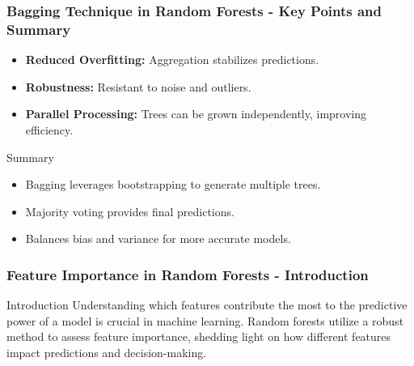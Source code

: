 \documentclass[aspectratio=169]{beamer}
\begin{document}
\begin{frame}[fragile]
    \frametitle{Bagging Technique in Random Forests - Key Points and Summary}
    \begin{itemize}
        \item \textbf{Reduced Overfitting:} Aggregation stabilizes predictions.
        \item \textbf{Robustness:} Resistant to noise and outliers.
        \item \textbf{Parallel Processing:} Trees can be grown independently, improving efficiency.
    \end{itemize}

    \begin{block}{Summary}
        \begin{itemize}
            \item Bagging leverages bootstrapping to generate multiple trees.
            \item Majority voting provides final predictions.
            \item Balances bias and variance for more accurate models.
        \end{itemize}
    \end{block}
\end{frame}

\begin{frame}[fragile]
    \frametitle{Feature Importance in Random Forests - Introduction}
    \begin{block}{Introduction}
        Understanding which features contribute the most to the predictive power of a model is crucial in machine learning. Random forests utilize a robust method to assess feature importance, shedding light on how different features impact predictions and decision-making.
    \end{block}
\end{frame}
\end{document}
